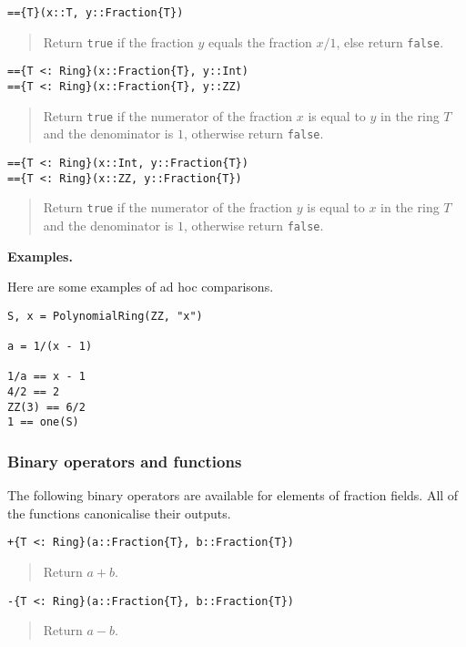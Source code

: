 \documentclass[a4paper,10pt]{article}
\newcommand{\code}{\lstinline}
\newcommand{\desc}[1]{\vspace{-3mm}\begin{quote}#1\end{quote}}
\begin{document}
{{{\begin{lstlisting}
=={T}(x::T, y::Fraction{T})
\end{lstlisting}

\desc{Return \code{true} if the fraction $y$ equals the fraction $x/1$, else
return \code{false}.}

\begin{lstlisting}
=={T <: Ring}(x::Fraction{T}, y::Int)
=={T <: Ring}(x::Fraction{T}, y::ZZ)
\end{lstlisting}

\desc{Return \code{true} if the numerator of the fraction $x$ is equal to $y$
in the ring $T$ and the denominator is $1$, otherwise return \code{false}.}

\begin{lstlisting}
=={T <: Ring}(x::Int, y::Fraction{T})
=={T <: Ring}(x::ZZ, y::Fraction{T})
\end{lstlisting}

\desc{Return \code{true} if the numerator of the fraction $y$ is equal to $x$
in the ring $T$ and the denominator is $1$, otherwise return \code{false}.}

\textbf{Examples.}

Here are some examples of ad hoc comparisons.

\begin{lstlisting}
S, x = PolynomialRing(ZZ, "x")

a = 1/(x - 1)

1/a == x - 1
4/2 == 2
ZZ(3) == 6/2
1 == one(S)
\end{lstlisting}

\subsubsection{Binary operators and functions}

The following binary operators are available for elements of fraction fields.
All of the functions canonicalise their outputs.

\begin{lstlisting}
+{T <: Ring}(a::Fraction{T}, b::Fraction{T})
\end{lstlisting}

\desc{Return $a + b$.}

\begin{lstlisting}
-{T <: Ring}(a::Fraction{T}, b::Fraction{T})
\end{lstlisting}

\desc{Return $a - b$.}

}}}
\end{document}
